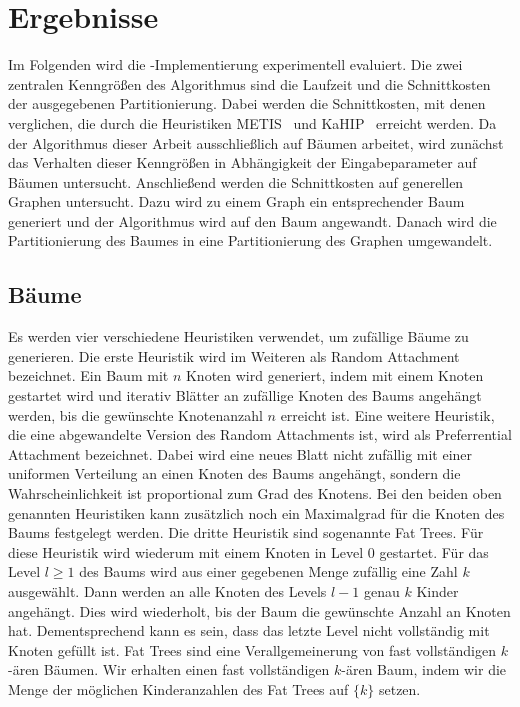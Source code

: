 
\chapter{Ergebnisse}\label{chapter:ergebnisse}
Im Folgenden wird die \Cpp\hyp Implementierung experimentell evaluiert.
Die zwei zentralen Kenngrößen des Algorithmus sind die Laufzeit und die Schnittkosten der ausgegebenen Partitionierung.
Dabei werden die Schnittkosten, mit denen verglichen, die durch die Heuristiken METIS~\cite{KK98} und KaHIP~\cite{SS13} erreicht werden.
Da der Algorithmus dieser Arbeit ausschließlich auf Bäumen arbeitet, wird zunächst das Verhalten dieser Kenngrößen in Abhängigkeit der Eingabeparameter auf Bäumen untersucht.
Anschließend werden die Schnittkosten auf generellen Graphen untersucht.
Dazu wird zu einem Graph ein entsprechender Baum generiert und der Algorithmus wird auf den Baum angewandt.
Danach wird die Partitionierung des Baumes in eine Partitionierung des Graphen umgewandelt.

\section{Bäume}
Es werden vier verschiedene Heuristiken verwendet, um zufällige Bäume zu generieren.
Die erste Heuristik wird im Weiteren als Random Attachment bezeichnet. 
Ein Baum mit $n$ Knoten wird generiert, indem mit einem Knoten gestartet wird und iterativ Blätter an zufällige Knoten des Baums angehängt werden, bis die gewünschte Knotenanzahl $n$ erreicht ist.
Eine weitere Heuristik, die eine abgewandelte Version des Random Attachments ist, wird als Preferrential Attachment bezeichnet.
Dabei wird eine neues Blatt nicht zufällig mit einer uniformen Verteilung an einen Knoten des Baums angehängt, sondern die Wahrscheinlichkeit ist proportional zum Grad des Knotens.
Bei den beiden oben genannten Heuristiken kann zusätzlich noch ein Maximalgrad für die Knoten des Baums festgelegt werden.
Die dritte Heuristik sind sogenannte Fat Trees.
Für diese Heuristik wird wiederum mit einem Knoten in Level $0$ gestartet.
Für das Level $l \geq 1$ des Baums wird aus einer gegebenen Menge zufällig eine Zahl $k$ ausgewählt.
Dann werden an alle Knoten des Levels $l - 1$ genau $k$ Kinder angehängt.
Dies wird wiederholt, bis der Baum die gewünschte Anzahl an Knoten hat. 
Dementsprechend kann es sein, dass das letzte Level nicht vollständig mit Knoten gefüllt ist.
Fat Trees sind eine Verallgemeinerung von fast vollständigen $k$\hyp ären Bäumen.
Wir erhalten einen fast vollständigen $k$\hyp ären Baum, indem wir die Menge der möglichen Kinderanzahlen des Fat Trees auf $\{k\}$ setzen.
